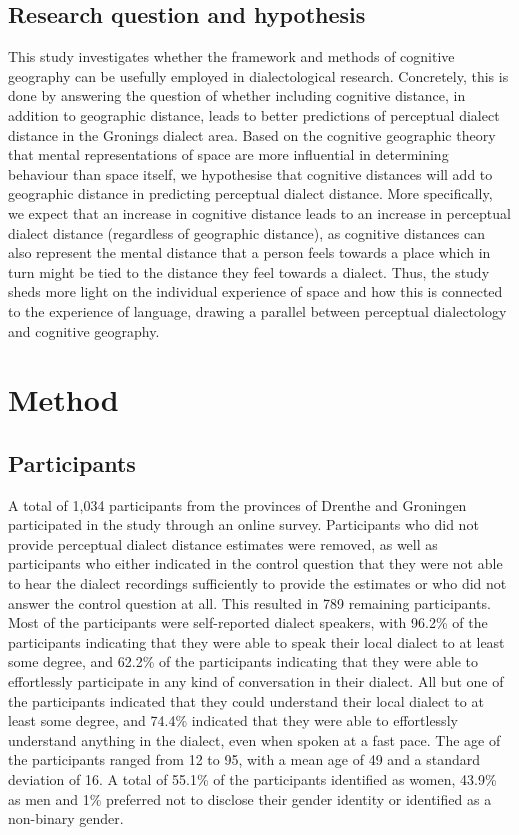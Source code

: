 \documentclass[output=paper,colorlinks,citecolor=brown,draft]{langscibook}
\begin{document}
\subsection{Research question and hypothesis}
This study investigates whether the framework and methods of cognitive geography can be usefully employed in dialectological research. Concretely, this is done by answering the question of whether including cognitive distance, in addition to geographic distance, leads to better predictions of perceptual dialect distance in the Gronings dialect area. Based on the cognitive geographic theory that mental representations of space are more influential in determining behaviour than space itself, we hypothesise that cognitive distances will add to geographic distance in predicting perceptual dialect distance. More specifically, we expect that an increase in cognitive distance leads to an increase in perceptual dialect distance (regardless of geographic distance), as cognitive distances can also represent the mental distance that a person feels towards a place which in turn might be tied to the distance they feel towards a dialect. Thus, the study sheds more light on the individual experience of space and how this is connected to the experience of language, drawing a parallel between perceptual dialectology and cognitive geography.

\section{Method}
\subsection{Participants}
A total of 1,034 participants from the provinces of Drenthe and Groningen participated in the study through an online survey. Participants who did not provide perceptual dialect distance estimates were removed, as well as participants who either indicated in the control question that they were not able to hear the dialect recordings sufficiently to provide the estimates or who did not answer the control question at all. This resulted in 789 remaining participants. Most of the participants were self-reported dialect speakers, with 96.2\% of the participants indicating that they were able to speak their local dialect to at least some degree, and 62.2\% of the participants indicating that they were able to effortlessly participate in any kind of conversation in their dialect. All but one of the participants indicated that they could understand their local dialect to at least some degree, and 74.4\% indicated that they were able to effortlessly understand anything in the dialect, even when spoken at a fast pace. The age of the participants ranged from 12 to 95, with a mean age of 49 and a standard deviation of 16. A total of 55.1\% of the participants identified as women, 43.9\% as men and 1\% preferred not to disclose their gender identity or identified as a non-binary gender. 
\end{document}
